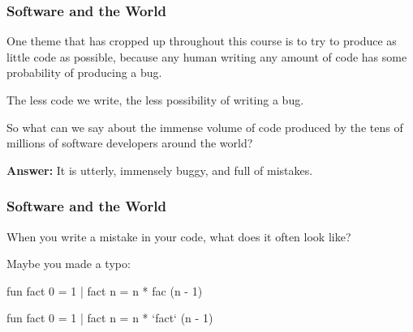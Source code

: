 \documentclass[aspectratio=169]{beamer}
\newcommand{\cmark}{{\color{green!80!black}\ding{51}}}
\newcommand{\xmark}{{\color{red}\ding{55}}}
\begin{document}
\begin{frame}[fragile]
  \frametitle{Software and the World}

  One theme that has cropped up throughout this course is to try
  to produce as little code as possible, because any human writing any
  amount of code has some probability of producing a bug.

  The less code we write, the less possibility of writing a bug.

  So what can we say about the immense volume of code produced by
  the tens of millions of software developers around the world?

  \textbf{Answer:} It is utterly, immensely buggy, and full of mistakes.
\end{frame}

\begin{frame}[fragile]
  \frametitle{Software and the World}

  When you write a mistake in your code, what does it often look like?

  Maybe you made a typo:

  \begin{center}
    \begin{minipage}[t][0.7in][t]{\textwidth}
      \begin{minipage}{0.2\textwidth}
        \centering
        \xmark
      \end{minipage}
      \begin{minipage}{0.75\textwidth}
        {\small
          \begin{codeblock}[rulecolor=\color{red}, framerule=0.3mm]
            fun fact 0 = 1
              | fact n = n * fac (n - 1)
          \end{codeblock}
          }
        \end{minipage}
    \end{minipage}
    \begin{minipage}[t][0.7in][t]{\textwidth}
      \begin{minipage}{0.2\textwidth}
        \centering
        \cmark
      \end{minipage}
      \begin{minipage}{0.75\textwidth}
        {\small
        \begin{codeblock}[rulecolor=\color{green!80!black}, framerule=0.3mm]
          fun fact 0 = 1
            | fact n = n * `fact` (n - 1)
        \end{codeblock}
        }
      \end{minipage}
    \end{minipage}
  \end{center}
\end{frame}
\end{document}
